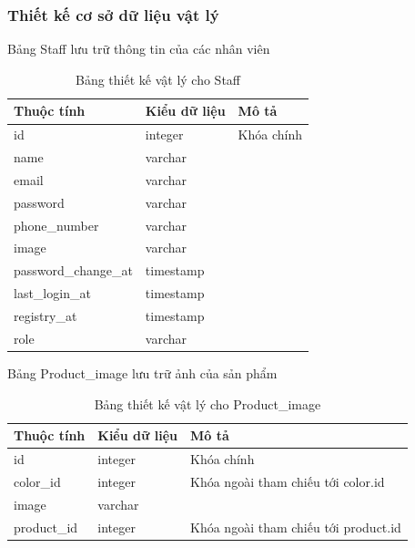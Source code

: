 \subsubsection{Thiết kế cơ sở dữ liệu vật lý}
Bảng Staff lưu trữ thông tin của các nhân viên
\begin{table}[H]
\centering
\begin{tabular}{|p{4cm}|p{3cm}|p{7cm}|}
\hline
Thuộc tính & Kiểu dữ liệu & Mô tả \\
\hline
id & integer & Khóa chính \\
\hline
name & varchar &  \\
\hline
email & varchar & \\
\hline
password & varchar & \\
\hline
phone\_number & varchar & \\
\hline
image & varchar & \\
\hline
password\_change\_at & timestamp & \\
\hline
last\_login\_at & timestamp &  \\
\hline
registry\_at & timestamp &  \\
\hline
role & varchar &  \\
\hline
\end{tabular}
\caption{Bảng thiết kế vật lý cho Staff}
\end{table}

\noindent Bảng Product\_image lưu trữ ảnh của sản phẩm
\begin{table}[H]
\centering
\begin{tabular}{|p{4cm}|p{3cm}|p{7cm}|}
\hline
Thuộc tính & Kiểu dữ liệu & Mô tả \\
\hline
id & integer & Khóa chính \\
\hline
color\_id & integer & Khóa ngoài tham chiếu tới color.id \\
\hline
image & varchar &  \\
\hline
product\_id & integer & Khóa ngoài tham chiếu tới product.id \\
\hline

\end{tabular}
\caption{Bảng thiết kế vật lý cho Product\_image}
\end{table}

